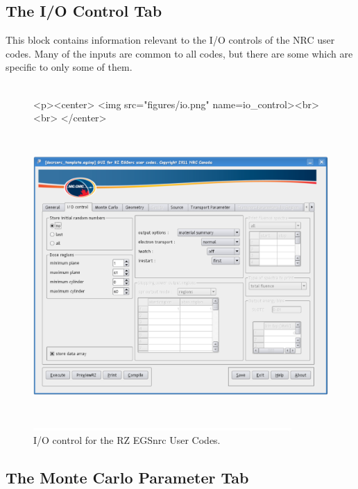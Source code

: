 \documentclass[12pt,twoside]{article}   %
\begin{document}
\newpage
\subsection{The I/O Control Tab}
\label{io}

This block contains information relevant to the I/O controls of the NRC user codes. 
Many of the inputs are common to all codes, but there are some which are specific to 
only some of them. \\ \\
\begin{figure}[htb]
\begin{htmlonly}
\begin{rawhtml}
<p><center>
<img src="figures/io.png" name=io_control><br><br>
</center>
\end{rawhtml}
\end{htmlonly}
\begin{latexonly}
\begin{center}
\includegraphics[height=10.78cm]{figures/io}
\end{center}
\end{latexonly}
\begin{center}
\includegraphics[height=1mm]{figures/fake2}
\end{center}
\caption{I/O control for the RZ EGSnrc User Codes.}
\label{io_control}
\end{figure}


\newpage
\subsection{The Monte Carlo Parameter Tab}
\label{mc}
\end{document}
